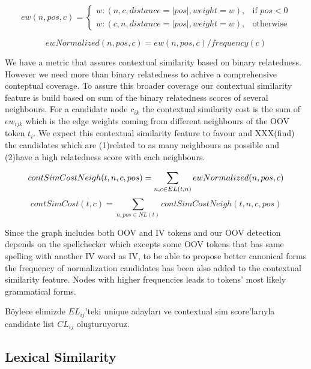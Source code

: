 \begin{equation}
ew(n,pos,c) =
\begin{cases}
  w : (n,c,distance = |pos|,weight=w), & \text{if } pos < 0 \\
  w : (c,n,distance = |pos|,weight=w), & \text{otherwise}
\end{cases}
\label{eq:ew}
\end{equation}

\begin{equation}
ewNormalized(n,pos,c) = ew(n,pos,c) / frequency(c)
\label{eq:ew_norm}
\end{equation}


We have a metric that assures contextual similarity based on binary relatedness. However we need more than binary relatedness to achive a comprehensive conteptual coverage. To assure this broader coverage our contextual similarity feature is build based on sum of the binary relatedness scores of several neighbours. For a candidate node $c_{ik}$ the contextual similarity cost is the sum of $ew_{ijk}$ which is the edge weights coming from different neighbours of the OOV token $t_i$. We expect this contextual similarity feature to favour and XXX(find) the candidates which are (1)related to as many neighbours as possible and (2)have a high relatedness score with each neighbours.

\begin{equation}
contSimCostNeigh(t,n,c,pos) = \sum_{n,c \in EL(t,n)}{ewNormalized(n,pos,c)} \\\\
\end{equation}
\begin{equation}
contSimCost(t,c) = \sum_{n,pos \in NL(t) }{contSimCostNeigh(t,n,c,pos)}
\label{eq:cont_cost}
\end{equation}

Since the graph includes both OOV and IV tokens and our OOV detection depends on the spellchecker which excepts some OOV tokens that has same spelling with another IV word as IV, to be able to propose better canonical forms the frequency of normalization candidates has been also added to the contextual similarity feature. Nodes with higher frequencies leads to tokens' most likely grammatical forms.

Böylece elimizde $EL_{ij}$'teki unique adayları ve contextual sim score'larıyla candidate list $CL_{ij}$ oluşturuyoruz.

\subsection{Lexical Similarity}

